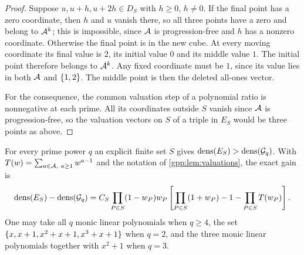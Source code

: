 \begin{proof}
Suppose $u,u+h,u+2h\in D_S$ with $h\ge0$, $h\ne0$. If the final point has a zero
coordinate, then $h$ and $u$ vanish there, so all three points have a zero and belong to
$\mathcal{A}^k$; this is impossible, since $\mathcal{A}$ is progression-free and $h$ has a nonzero
coordinate. Otherwise the final point is in the new cube. At every moving coordinate its
final value is $2$, its initial value $0$ and its middle value $1$. The initial point
therefore belongs to $\mathcal{A}^k$. Any fixed coordinate must be $1$, since its value lies in
both $\mathcal{A}$ and $\{1,2\}$. The middle point is then the deleted all-ones vector.

For the consequence, the common valuation step of a polynomial ratio is nonnegative at each
prime. All its coordinates outside $S$ vanish since $\mathcal{A}$ is progression-free, so the
valuation vectors on $S$ of a triple in $E_S$ would be three points as above.
\end{proof}

\begin{theorem}\label{gpp:thm:natural}
For every prime power $q$ an explicit finite set $S$ gives
$\operatorname{dens}(E_S)>\operatorname{dens}(\mathcal{G}_q)$. With $T(w)=\sum_{a\in\mathcal{A},\ a\ge1}w^{a-1}$ and the
notation of \cref{gpp:lem:valuations}, the exact gain is
\begin{equation}\label{gpp:eq:gain}
 \operatorname{dens}(E_S)-\operatorname{dens}(\mathcal{G}_q)=C_S\prod_{P\in S}(1-w_P)w_P
 \left[\prod_{P\in S}(1+w_P)-1-\prod_{P\in S}T(w_P)\right].
\end{equation}
One may take all $q$ monic linear polynomials when $q\ge4$, the set
$\{x,x+1,x^2+x+1,x^3+x+1\}$ when $q=2$, and the three monic linear polynomials together
with $x^2+1$ when $q=3$.
\end{theorem}

